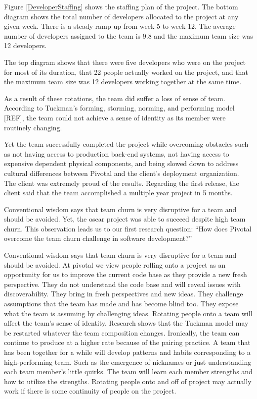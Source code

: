 Figure \ref{DeveloperStaffing} shows the staffing plan of the project. The bottom diagram shows the total number of developers allocated to the project at any given week. There is a steady ramp up from week 5 to week 12. The average number of developers assigned to the team is 9.8 and the maximum team size was 12 developers.

The top diagram shows that there were five developers who were on the project for most of its duration, that 22 people actually worked on the project, and that the maximum team size was 12 developers working together at the same time.

As a result of these rotations, the team did suffer a loss of sense of team. According to Tuckman's forming, storming, norming, and performing model [REF], the team could not achieve a sense of identity as its member were routinely changing. 

Yet the team successfully completed the project while overcoming obstacles such as not having access to production back-end systems, not having access to expensive dependent physical components, and being slowed down to address cultural differences between Pivotal and the client's deployment organization. The client was extremely proud of the results. Regarding the first release, the client said that the team accomplished a multiple year project in 5 months. 

Conventional wisdom says that team churn is very disruptive for a team and should be avoided. Yet, the oscar project was able to succeed despite high team churn. This observation leads us to our first research question: “How does Pivotal overcome the team churn challenge in software development?”

Conventional wisdom says that team churn is very disruptive for a team and should be avoided. 
At pivotal we view people rolling onto a project as an opportunity for us to improve the current code base as they provide a new fresh perspective. They do not understand the code base and  will reveal issues with discoverability. They bring in fresh perspectives and new ideas. They challenge assumptions that the team has made and has become blind too. They expose what the team is assuming by challenging ideas. Rotating people onto a team will affect the team's sense of identity. Research shows that the Tuckman model may be restarted whatever the team composition changes. Ironically, the team can continue to produce at a higher rate because of the pairing practice. A team that has been together for a while will develop patterns and habits corresponding to a high-performing team. Such as the emergence of nicknames or just understanding each team member's little quirks. The team will learn each member strengths and how to utilize the strengths. Rotating people onto and off of project may actually work if there is some continuity of people on the project. 


